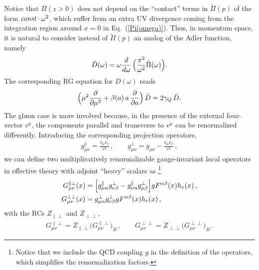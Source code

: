 \documentclass[12pt]{article}
\numberwithin{equation}{section}
\newcommand{\1}[1]{\mathbf{1}^{#1}}
\newcommand{\2}[1]{\mathbf{2}^{#1}}
\newcommand{\3}[1]{\mathbf{3}^{#1}}
\newcommand{\4}[1]{\mathbf{4}^{#1}}
\newcommand{\5}[1]{\mathbf{5}^{#1}}
\newcommand{\tPi}{\tilde{\Pi}}
\newcommand{\tD}{\tilde{D}}
\newcommand{\EQN}[1]{\hspace{3mm}\fbox{\fbox{$#1$}} \label{#1}}
\newcommand{\mlabel}[1]{ \text{\footnotesize \hspace{3mm}\fbox{\fbox{$#1$}} \label{#1}}}
\renewcommand{\EQN}[1]{\mlabel{#1}}
\renewcommand{\mlabel}[1]{\label{#1}}
\renewcommand{\EQN}[1]{\label{#1}}
\newcommand{\prd}{\partial}
\newcommand{\beq}{\begin{equation}}
\newcommand{\eeq}{\end{equation}}
\newcommand{\re}[1]{(\ref{#1})}
\newcommand{\ga}{\gamma}
\newcommand{\om}{\omega}
\newcommand{\G}{G}
\begin{document}
Notice that $\Pi(z > 0 )$ does not depend on  the ``contact'' terms in 
$\tilde{\Pi}(p)$ of the form $\mbox{\it const} \cdot\om^2$, which suffer 
from an extra UV divergence coming from the integration region around $x=0$ 
in Eq.~\re{Pi(omega)}.
Thus, in momentum space, it is
natural to consider instead of $\tilde{\Pi}(p)$ an analog of the Adler function, namely
\beq
\tD(\om) =  \om \frac{d}{d \om} \,\Bigl(  \frac{\pi^2}{\om^2} \tPi(\om) \Bigr)
{}.
\EQN{Adler}
\eeq
The corresponding RG equation for $D(\om)$ reads
  \beq
\Bigl(\mu^2\frac{\prd }{\prd \mu^2} + \beta(a)\, a\, \frac{\prd }{\prd a}\Bigr)\, \tD = 2\ga_Q \,\tD 
{}.
\EQN{RG:D}
\eeq
The gluon case is more involved because, in the presence of the external four-vector $v^\mu$, the components parallel 
and transverse to  $v^\mu$ can be renormalized differently. Introducing the corresponding projection operators,
\begin{align}
   g_{\mu\nu}^\parallel = \frac{v_\mu v_\nu}{v^2}\,, \qquad
   g_{\mu\nu}^\perp = g_{\mu\nu} - \frac{v_\mu v_\nu}{v^2}\,,  
\end{align}
we can define two multiplicatively renormalizable gauge-invariant local operators in effective theory with adjoint ``heavy'' scalars as%
\footnote{Notice that we include the QCD coupling $g$ in the definition of the operators, which simplifies the renormalization factors.}
\begin{align}
 \G^{\parallel\perp}_{\mu\nu}(x) &=    
\Big[g^\parallel_{\mu\alpha}  g^\perp_{\nu\beta} - g^\parallel_{\nu\alpha}  g^\perp_{\mu\beta} \Big] g F^{\alpha\beta}(x) h_v(x)\,,
\notag\\
 \G^{\perp\perp}_{\mu\nu}(x) &=    g^\perp_{\mu\alpha}  g^\perp_{\nu\beta} g F^{\alpha\beta}(x) h_v(x)\,, 
\end{align}
with the RCs $Z_{\parallel\perp}$ and $Z_{\perp\perp}$,
\begin{align}
    \G^{\parallel\perp}_{\mu\nu} = Z_{\parallel\perp} \big(\G^{\parallel\perp}_{\mu\nu}\big)_B\,, \qquad
    \G^{\perp\perp}_{\mu\nu} = Z_{\perp\perp} \big(\G^{\perp\perp}_{\mu\nu}\big)_B\,.
\mlabel{RC-gluons}
\end{align}
\end{document}
